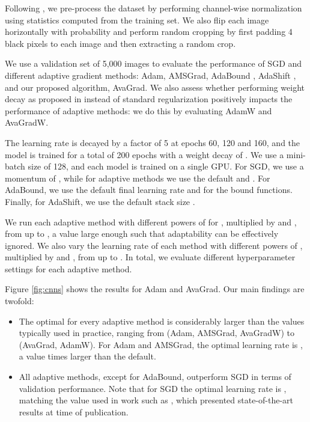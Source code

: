 \documentclass{article}
\begin{document}
Following \citet{wide}, we pre-process the dataset by performing channel-wise normalization using statistics computed from the training set. We also flip each image horizontally with  probability and perform random cropping by first padding 4 black pixels to each image and then extracting a random  crop.

We use a validation set of 5,000 images to evaluate the performance of SGD and different adaptive gradient methods:
Adam, AMSGrad, AdaBound \citep{adabound, adabound2}, AdaShift \citep{adashift}, and our proposed algorithm, AvaGrad. We also
assess whether performing weight decay as proposed in \citet{adamw} instead
of standard  regularization positively impacts the performance of adaptive
methods: we do this by evaluating AdamW and AvaGradW.

The learning rate is decayed by a factor of 5 at epochs 60,
120 and 160, and the model is trained for a total of 200 epochs with a weight
decay of . We use a mini-batch size of 128, and each model is trained on a single GPU. For SGD, we use a momentum of , while for adaptive methods we use the default  and . For AdaBound, we use the default final learning rate  and  for the bound functions. Finally, for AdaShift, we use the default stack size .

We run each adaptive method with different powers of  for , multiplied by  and , from  up to , a value large enough such that adaptability can be effectively ignored. We also vary the learning rate 
of each method with different powers of , multiplied by  and , from  up to . In total, we evaluate  different hyperparameter settings for each adaptive method.

Figure \ref{fig:cnns} shows the results for
Adam and AvaGrad.  Our main findings are twofold:

\vspace{-5.0pt}
\begin{itemize}[leftmargin=0.2in]
   \item{
      The optimal  for every adaptive method is considerably larger
      than the values typically used in practice, ranging from  (Adam,
      AMSGrad, AvaGradW) to  (AvaGrad, AdamW).  For Adam and AMSGrad, the
      optimal learning rate is , a value  times
      larger than the default.
   }
   \item{
      All adaptive methods, except for AdaBound, outperform SGD in terms of
      validation performance.  Note that for SGD the optimal learning rate is
      , matching the value used in work such as
      \citet{resnet1, wide, resnext}, which presented state-of-the-art results
      at time of publication.
   }
\end{itemize}
\end{document}
